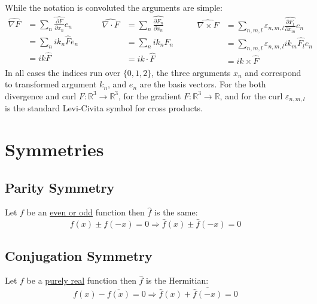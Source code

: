 While the notation is convoluted the arguments are simple:
\[\begin{aligned}
	\widehat{\nabla F} &= \sum_n\widehat{\frac{\partial F}{\partial x_n}}e_n\\
	&= \sum_nik_n\hat{F}e_n\\
	&= ik\hat{F}\\
\end{aligned}\quad\quad
\begin{aligned}
	\widehat{\nabla\cdot F} &= \sum_n\widehat{\frac{\partial F_n}{\partial x_n}}\\
	&= \sum_nik_n\hat{F}_n\\
	&= ik\cdot\hat{F}\\
\end{aligned}\quad\quad
\begin{aligned}
	\widehat{\nabla\times F}&=\sum_{n,m,l}\varepsilon_{n,m,l}\widehat{\frac{\partial F_l}{\partial x_m}}e_n\\
	&=\sum_{n,m,l}\varepsilon_{n,m,l}ik_m\hat{F_l}e_n\\
	&=ik\times \hat{F}
\end{aligned}\]
In all cases the indices run over $\{0,1,2\}$, 
the three arguments $x_n$ and correspond to transformed argument $k_n$,
and $e_n$ are the basis vectors.
For the both divergence and curl $F:\mathbb{R}^3\rightarrow\mathbb{R}^3$,
for the gradient $F:\mathbb{R}^3\rightarrow\mathbb{R}$,
and for the curl $\varepsilon_{n,m,l}$ is the standard Levi-Civita symbol for cross products.
\section{Symmetries}
\subsection{Parity Symmetry}
\label{sec:parity-sym}
Let $f$ be an \hyperref[appx:real-img-odd-even]{even or odd} function then $\hat{f}$ is the same:
\[f(x)\pm f(-x) = 0 \Rightarrow \hat{f}(x)\pm\hat{f}(-x) = 0\]

\subsection{Conjugation Symmetry}
\label{sec:conjugation-sym}
Let $f$ be a \hyperref[appx:real-img-odd-even]{purely real} function then $\hat{f}$ is the Hermitian:
\[f(x) - \overline{f(x)} = 0 \Rightarrow \hat{f}(x)+\overline{\hat{f}(-x)} = 0\]

